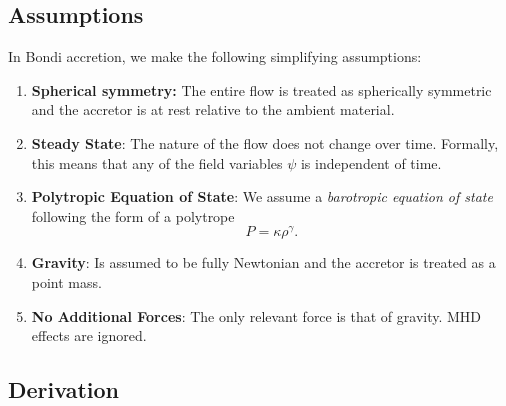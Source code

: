 \subsection*{Assumptions}

In Bondi accretion, we make the following simplifying assumptions:
\vspace{0.5cm}
\begin{enumerate}
    \item \textbf{Spherical symmetry: }The entire flow is treated as spherically symmetric and the accretor is at rest relative to the ambient material. 
    \item \textbf{Steady State}: The nature of the flow does not change over time. Formally, this means that any of the field variables $\psi$ is independent of time. 
    \item \textbf{Polytropic Equation of State}: We assume a \textit{barotropic equation of state} following the form of a polytrope
    \[
    P = \kappa \rho^\gamma.
    \]
    \item \textbf{Gravity}: Is assumed to be fully Newtonian and the accretor is treated as a point mass.
    \item \textbf{No Additional Forces}: The only relevant force is that of gravity. MHD effects are ignored.
\end{enumerate}

\subsection*{Derivation}

